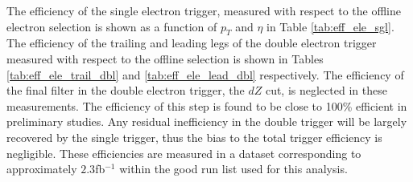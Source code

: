 
The efficiency of the single electron trigger, measured 
with respect to the offline electron selection is shown 
as a function of $p_T$ and $\eta$ in Table \ref{tab:eff_ele_sgl}.
The efficiency of the trailing and leading legs of the double electron trigger
measured with respect to the offline selection is shown
in Tables \ref{tab:eff_ele_trail_dbl} and \ref{tab:eff_ele_lead_dbl} respectively.
The efficiency of the final filter in the double electron trigger, the $dZ$ cut,
is neglected in these measurements.  The efficiency of this step is found to be
close to 100\% efficient in preliminary studies.  Any residual inefficiency
in the double trigger will be largely recovered by the single trigger,
thus the bias to the total trigger efficiency is negligible.
These efficiencies are measured in a dataset corresponding
to approximately $2.3$fb$^{-1}$ within the good run list used for this analysis.

